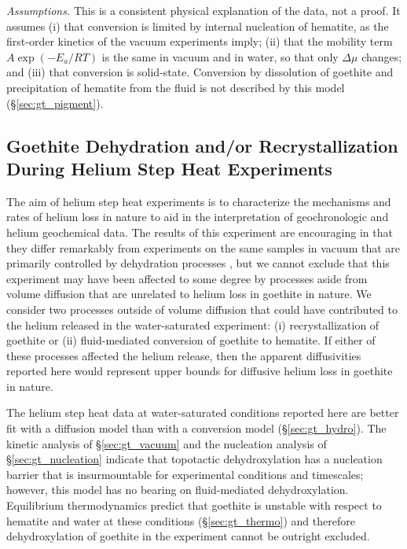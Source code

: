 \textit{Assumptions.} This is a consistent physical explanation of the data, not a proof. It
assumes (i) that conversion is limited by internal nucleation of hematite, as the first-order kinetics
of the vacuum experiments imply; (ii) that the mobility term $A\exp(-E_a/RT)$ is the same in vacuum and
in water, so that only $\Delta\mu$ changes; and (iii) that conversion is solid-state. Conversion by
dissolution of goethite and precipitation of hematite from the fluid is not described by this model
(\S\ref{sec:gt_pigment}).

\subsection{Goethite Dehydration and/or Recrystallization During Helium Step Heat Experiments}\label{goethite-dehydration-andor-recrystallization-during-hydrothermal-experiments}

The aim of helium step heat experiments is to characterize the
mechanisms and rates of helium loss in nature to aid in the interpretation
of geochronologic and helium geochemical data. The results of this
experiment are encouraging in that they differ remarkably from
experiments on the same samples in vacuum that are primarily
controlled by dehydration processes \citep{farley2024}, but we cannot exclude that this
experiment may have been affected to some degree by processes aside from
volume diffusion that are unrelated to helium loss in
goethite in nature. We consider two processes outside of volume diffusion that could have contributed to the helium released in the
water-saturated experiment: (i) recrystallization of goethite or (ii) fluid-mediated conversion of goethite to hematite. If either 
of these processes affected the helium release, then the apparent diffusivities reported here would represent upper bounds for 
diffusive helium loss in goethite in nature.

The helium step heat data at water-saturated conditions reported here are better fit with a diffusion model than with a
conversion model (\S\ref{sec:gt_hydro}). The kinetic analysis of \S\ref{sec:gt_vacuum} and the nucleation analysis of
\S\ref{sec:gt_nucleation} indicate that topotactic dehydroxylation has a nucleation barrier that is insurmountable for
experimental conditions and timescales; however, this model has no bearing on fluid-mediated dehydroxylation. 
Equilibrium thermodynamics predict that goethite is unstable with respect to hematite and water at
these conditions \citep{majzlan2003} (\S\ref{sec:gt_thermo}) and therefore dehydroxylation of goethite
in the experiment cannot be outright excluded. 

